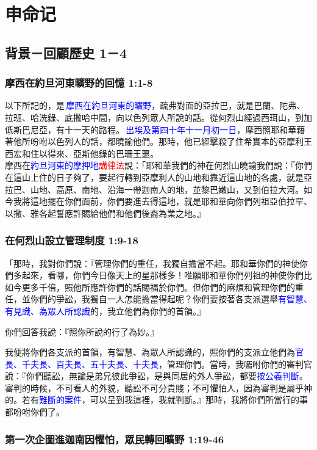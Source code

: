 \chapter{申命记}
\section{背景－回顧歷史 1－4}
\subsection{摩西在約旦河東曠野的回憶 1:1-8}
以下所記的，是 \textcolor{blue}{摩西在約旦河東的曠野}，疏弗對面的亞拉巴，就是巴蘭、陀弗、拉班、哈洗錄、底撒哈中間，向以色列眾人所說的話。從何烈山經過西珥山，到加低斯巴尼亞，有十一天的路程。 \textcolor{blue}{出埃及第四十年十一月初一日}，摩西照耶和華藉著他所吩咐以色列人的話，都曉諭他們。那時，他已經擊殺了住希實本的亞摩利王西宏和住以得來、亞斯他錄的巴珊王噩。\\
摩西在\textcolor{blue}{約旦河東的摩押地}\textcolor{red}{講律法}說：「耶和華我們的神在何烈山曉諭我們說：『你們在這山上住的日子夠了，要起行轉到亞摩利人的山地和靠近這山地的各處，就是亞拉巴、山地、高原、南地、沿海一帶迦南人的地，並黎巴嫩山，又到伯拉大河。如今我將這地擺在你們面前，你們要進去得這地，就是耶和華向你們列祖亞伯拉罕、以撒、雅各起誓應許賜給他們和他們後裔為業之地。』

\subsection{在何烈山設立管理制度 1:9-18}
「那時，我對你們說：『管理你們的重任，我獨自擔當不起。耶和華你們的神使你們多起來，看哪，你們今日像天上的星那樣多！唯願耶和華你們列祖的神使你們比如今更多千倍，照他所應許你們的話賜福於你們。但你們的麻煩和管理你們的重任，並你們的爭訟，我獨自一人怎能擔當得起呢？你們要按著各支派選舉\textcolor{blue}{有智慧、有見識、為眾人所認識}的，我立他們為你們的首領。』

你們回答我說：『照你所說的行了為妙。』

我便將你們各支派的首領，有智慧、為眾人所認識的，照你們的支派立他們為\textcolor{blue}{官長、千夫長、百夫長、五十夫長、十夫長}，管理你們。當時，我囑咐你們的審判官說：『你們聽訟，無論是弟兄彼此爭訟，是與同居的外人爭訟，都要\textcolor{blue}{按公義判斷}。審判的時候，不可看人的外貌，聽訟不可分貴賤；不可懼怕人，因為審判是屬乎神的。若有\textcolor{blue}{難斷的案件}，可以呈到我這裡，我就判斷。』那時，我將你們所當行的事都吩咐你們了。


\subsection{第一次企圖進迦南因懼怕，眾民轉回曠野 1:19-46}
